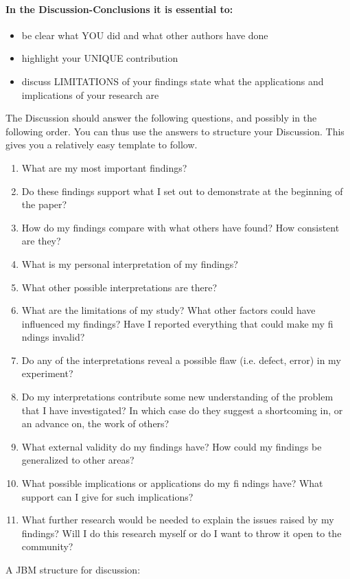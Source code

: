 \paragraph{In the Discussion-Conclusions it is essential to:}

\begin{itemize}
	\item
		be clear what YOU did and what other authors have done
	\item
		highlight your UNIQUE contribution
	
	\item
		discuss LIMITATIONS of your findings state what the
		 applications and implications of your research are
\end{itemize}

The Discussion should answer the following questions, and possibly in the following order. 
You can thus use the answers to structure your Discussion. This gives you
a relatively easy template to follow.


\begin{enumerate}
	\item
		What are my most important findings?
	\item
		Do these findings support what I set out to demonstrate at the beginning of the
		paper?
	\item
		How do my findings compare with what others have found? How consistent are
		they?
	\item
		What is my personal interpretation of my findings?
	\item
		What other possible interpretations are there?
	\item
		What are the limitations of my study? What other factors could have influenced
		my findings? Have I reported everything that could make my fi ndings invalid?
	\item
		Do any of the interpretations reveal a possible flaw (i.e. defect, error) in my
		experiment?
	\item
		Do my interpretations contribute some new understanding of the problem that I
		have investigated? In which case do they suggest a shortcoming in, or an
		advance on, the work of others?
	\item
		What external validity do my findings have? How could my findings be 
		generalized to other areas?
	\item
		What possible implications or applications do my fi ndings have? What support
		can I give for such implications?
	\item
		What further research would be needed to explain the issues raised by my 
		findings? Will I do this research myself or do I want to throw it open to the
		community?
\end{enumerate}
A JBM structure for discussion:
